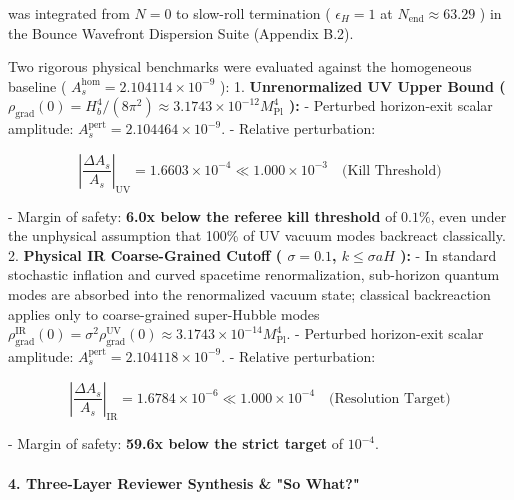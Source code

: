 \documentclass[11pt,a4paper]{article}
\theoremstyle{definition}\newtheorem{definition}{Definition}
\theoremstyle{remark}\newtheorem{remark}{Remark}
\begin{document}
was integrated from $N = 0$ to slow-roll termination ( $\epsilon_H = 1$ at $N_{\text{end}} \approx 63.29$ ) in the Bounce Wavefront Dispersion Suite (Appendix B.2).

Two rigorous physical benchmarks were evaluated against the homogeneous baseline ( $A_s^{\text{hom}} = 2.104114 \times 10^{-9}$ ):
1. \textbf{Unrenormalized UV Upper Bound ( $\rho_{\text{grad}}(0) = H_b^4 / (8\pi^2) \approx 3.1743 \times 10^{-12} M_{\text{Pl}}^4$ ):}
- Perturbed horizon-exit scalar amplitude: $A_s^{\text{pert}} = 2.104464 \times 10^{-9}$.
- Relative perturbation:


\begin{equation}
\left|\frac{\Delta A_s}{A_s}\right|_{\text{UV}} = 1.6603 \times 10^{-4} \ll 1.000 \times 10^{-3} \quad \text{(Kill Threshold)}
\end{equation}


- Margin of safety: \textbf{6.0x below the referee kill threshold} of $0.1\%$, even under the unphysical assumption that 100\% of UV vacuum modes backreact classically.
2. \textbf{Physical IR Coarse-Grained Cutoff ( $\sigma = 0.1$, $k \le \sigma a H$ ):}
- In standard stochastic inflation and curved spacetime renormalization, sub-horizon quantum modes are absorbed into the renormalized vacuum state; classical backreaction applies only to coarse-grained super-Hubble modes $\rho_{\text{grad}}^{\text{IR}}(0) = \sigma^2 \rho_{\text{grad}}^{\text{UV}}(0) \approx 3.1743 \times 10^{-14} M_{\text{Pl}}^4$.
- Perturbed horizon-exit scalar amplitude: $A_s^{\text{pert}} = 2.104118 \times 10^{-9}$.
- Relative perturbation:


\begin{equation}
\left|\frac{\Delta A_s}{A_s}\right|_{\text{IR}} = 1.6784 \times 10^{-6} \ll 1.000 \times 10^{-4} \quad \text{(Resolution Target)}
\end{equation}


- Margin of safety: \textbf{59.6x below the strict target} of $10^{-4}$.
\paragraph{4. Three-Layer Reviewer Synthesis \& "So What?"}
\end{document}
